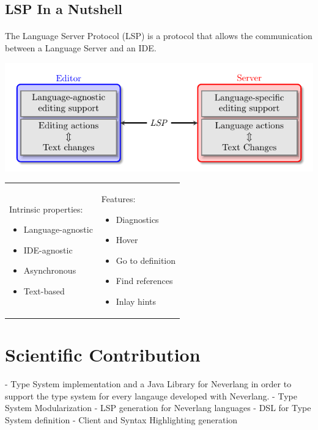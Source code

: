 \documentclass[9pt,xcolor=table,svgnames]{beamer}
\begin{document}
\subsection[In a Nutshell]{LSP In a Nutshell}
\begin{frame}{\secname}
    \framesubtitle{\subsecname}

    The \alert{Language Server Protocol} (LSP) is a protocol that allows the communication between a \alert{Language Server} and an \alert{IDE}.

    \pause

    \includegraphics[width=1\textwidth]{figs/lsp-diagram.pdf}

    \begin{tabular}{p{} p{}}
    Intrinsic properties:
    \begin{itemize}
        \item Language-agnostic
        \item IDE-agnostic
        \item Asynchronous
        \item Text-based
    \end{itemize}
        &
    Features:
    \begin{itemize}
        \item Diagnostics
        \item Hover
        \item Go to definition
        \item Find references
        \item Inlay hints
    \end{itemize}
    \end{tabular}
\end{frame}


\section[Scientific Contribution]{Scientific Contribution}

- Type System implementation and a Java Library for Neverlang in order to support the type system for every langauge developed with Neverlang.
- Type System Modularization
- LSP generation for Neverlang languages
- DSL for Type System definition
- Client and Syntax Highlighting generation
\end{document}
